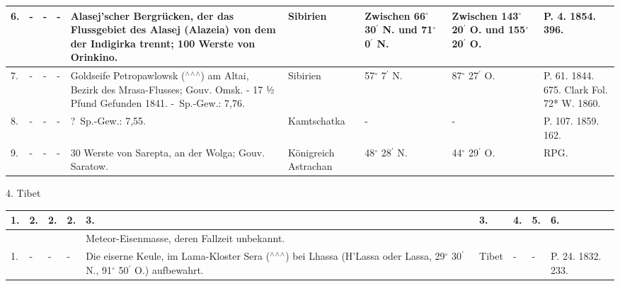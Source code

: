\documentclass[a4paper, 11pt, oneside, polutonikogreek, german]{article}
\begin{document}
\begin{landscape}
\begin{table}[!ht]
\begin{tabular}{|l|l|l|l|l|l|l|l|l|}
        6. & - & - & - & Alasej’scher Bergrücken, der das Flussgebiet des Alasej (Alazeia) von dem der Indigirka trennt; 100 Werste von Orinkino. & Sibirien & Zwischen 66$^\circ$ 30$^\prime$ N. und 71$^\circ$ 0$^\prime$ N. & Zwischen 143$^\circ$ 20$^\prime$ O. und 155$^\circ$ 20$^\prime$ O. & P. 4. 1854. 396. \\ \hline
        7. & - & - & - & Goldseife Petropawlowsk ($^\wedge$$^\wedge$$^\wedge$) am Altai, Bezirk des Mrasa-Flusses; Gouv. Omsk. - 17 ½ Pfund Gefunden 1841. - Sp.-Gew.: 7,76. & Sibirien & 57$^\circ$ 7$^\prime$ N. & 87$^\circ$ 27$^\prime$ O. & P. 61. 1844. 675. Clark Fol. 72* W. 1860. \\ \hline
        8. & - & - & - & ? Sp.-Gew.: 7,55. & Kamtschatka & - & - & P. 107. 1859. 162. \\ \hline
        9. & - & - & - & 30 Werste von Sarepta, an der Wolga; Gouv. Saratow. & Königreich Astrachan & 48$^\circ$ 28$^\prime$ N. & 44$^\circ$ 29$^\prime$ O. & RPG. \\ \hline
    \end{tabular}
\end{table}
\end{landscape}
\clearpage
\begin{landscape}
4. Tibet
\begin{table}[!ht]
    \centering
    \begin{tabular}{|l|l|l|l|l|l|l|l|l|}
    \hline
        1. & 2. & 2. & 2. & 3. & 3. & 4. & 5. & 6. \\ \hline
          &   &   &   & Meteor-Eisenmasse, deren Fallzeit unbekannt. &   &   &   &   \\ \hline
        1. & - & - & - & Die eiserne Keule, im Lama-Kloster Sera ($^\wedge$$^\wedge$$^\wedge$) bei Lhassa (H’Lassa oder Lassa, 29$^\circ$ 30$^\prime$ N., 91$^\circ$ 50$^\prime$ O.) aufbewahrt. & Tibet & - & - & P. 24. 1832. 233. \\ \hline
    \end{tabular}
\end{table}
\end{landscape}
\clearpage
\end{document}

